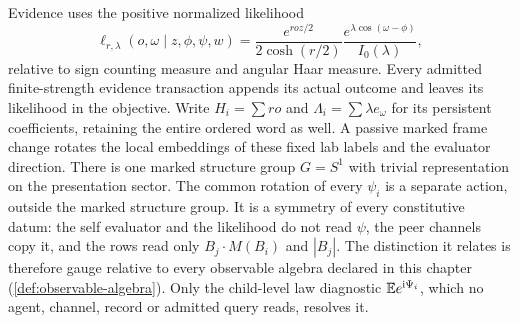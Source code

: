 Evidence uses the positive normalized likelihood
\begin{equation}
 \ell_{r,\lambda}(o,\omega\mid z,\phi,\psi,w)
 =\frac{e^{ro z/2}}{2\cosh(r/2)}
 \frac{e^{\lambda\cos(\omega-\phi)}}{I_0(\lambda)},
 \label{lp:likelihood}
\end{equation}
relative to sign counting measure and angular Haar measure. Every admitted finite-strength evidence transaction appends its actual outcome and leaves its likelihood in the objective. Write $H_i=\sum r o$ and $\Lambda_i=\sum\lambda e_\omega$ for its persistent coefficients, retaining the entire ordered word as well. A passive marked frame change rotates the local embeddings of these fixed lab labels and the evaluator direction. There is one marked structure group $G=S^1$ with trivial representation on the presentation sector. The common rotation of every $\psi_i$ is a separate action, outside the marked structure group. It is a symmetry of every constitutive datum: the self evaluator and the likelihood do not read $\psi$, the peer channels copy it, and the rows read only $B_j\cdot M(B_i)$ and $|B_j|$. The distinction it relates is therefore gauge relative to every observable algebra declared in this chapter (\cref{def:observable-algebra}). Only the child-level law diagnostic $\mathbb E e^{\mathrm i\Psi_i}$, which no agent, channel, record or admitted query reads, resolves it.

